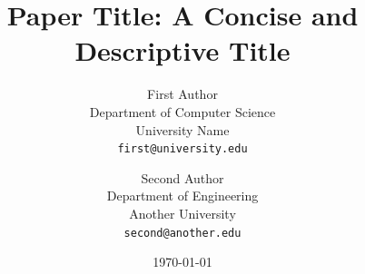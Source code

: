 
\title{Paper Title: A Concise and Descriptive Title}

\author{%
    First Author \\
    Department of Computer Science \\
    University Name \\
    \texttt{first@university.edu}
    \and
    Second Author \\
    Department of Engineering \\
    Another University \\
    \texttt{second@another.edu}
}

\date{\today}
